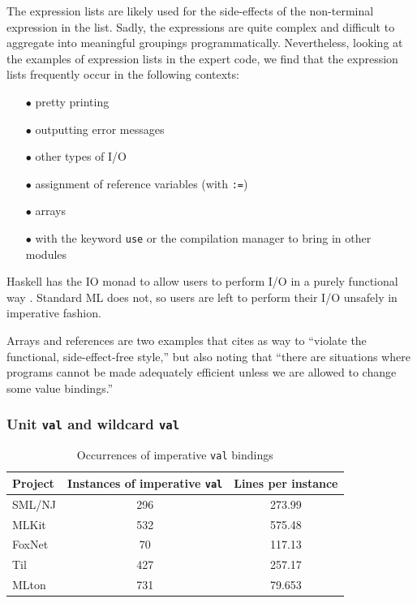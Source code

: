 \documentclass[12pt,abstracton]{scrartcl}
\begin{document}
The expression lists are likely used for the side-effects of the non-terminal
expression in the list. Sadly, the expressions are quite complex and difficult
to aggregate into meaningful groupings programmatically. Nevertheless,
looking at the examples of expression lists in the expert code, we find that
the expression lists frequently occur in the following contexts:
\begin{itemize}
\item[$\bullet$] pretty printing
\item[$\bullet$] outputting error messages
\item[$\bullet$] other types of I/O
\item[$\bullet$] assignment of reference variables (with \texttt{:=})
\item[$\bullet$] arrays
\item[$\bullet$] with the keyword \texttt{use} or the compilation manager to bring in other modules
\end{itemize}

Haskell has the IO monad to allow users to perform I/O in a purely functional way \cite{Jon93}.
Standard ML does not, so users are left to perform their
I/O unsafely in imperative fashion.

Arrays and references are two examples that \cite{Ull98} cites as way to ``violate the functional,
side-effect-free style,'' but also noting that ``there are situations where programs cannot
be made adequately efficient unless we are allowed to change some value bindings.''
\subsubsection{Unit \texttt{val} and wildcard \texttt{val}}
\begin{table}[h!]
\centering
\begin{tabular}{|l||c|c|}
\hline
Project & Instances of imperative \texttt{val} & Lines per instance \\ \hline\hline
SML/NJ & 296 & 273.99 \\
MLKit & 532 & 575.48 \\
FoxNet & 70 & 117.13 \\
Til & 427 & 257.17 \\
MLton & 731 & 79.653 \\ \hline
\end{tabular}
\caption{Occurrences of imperative \texttt{val} bindings}
\label{table:val}
\end{table}
\end{document}
